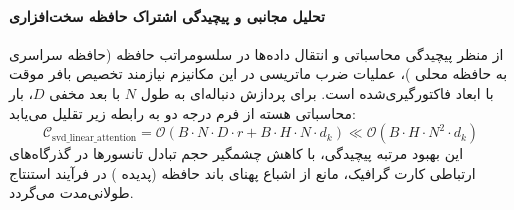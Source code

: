 \paragraph{تحلیل مجانبی و پیچیدگی اشتراک حافظه سخت‌افزاری}
از منظر پیچیدگی محاسباتی و انتقال داده‌ها در سلسومراتب حافظه (حافظه سراسری  به حافظه محلی )، عملیات ضرب ماتریسی در این مکانیزم نیازمند تخصیص بافر موقت با ابعاد فاکتورگیری‌شده است. برای پردازش دنباله‌ای به طول $N$ با بعد مخفی $D$، بار محاسباتی هسته از فرم درجه دو به رابطه زیر تقلیل می‌یابد:
\begin{equation}
\label{eq:complexity_svd_linear_attention}
\mathcal{C}_{\text{svd\_linear\_attention}} = \mathcal{O}\left( B \cdot N \cdot D \cdot r + B \cdot H \cdot N \cdot d_k \right) \ll \mathcal{O}\left( B \cdot H \cdot N^2 \cdot d_k \right)
\end{equation}
این بهبود مرتبه پیچیدگی، با کاهش چشمگیر حجم تبادل تانسورها در گذرگاه‌های ارتباطی کارت گرافیک، مانع از اشباع پهنای باند حافظه (پدیده ) در فرآیند استنتاج طولانی‌مدت می‌گردد.